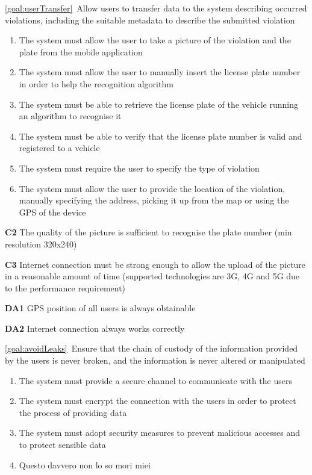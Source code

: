 \begin{description}
		\item \ref{goal:userTransfer}\ Allow users to transfer data to the system describing occurred violations, including the suitable metadata to describe the submitted violation			\begin{enumerate}[resume*]
				\item The system must allow the user to take a picture of the violation and the plate from the mobile application
  				\item The system must allow the user to manually insert the license plate number in order to help the recognition algorithm
  				\item The system must be able to retrieve the license plate of the vehicle running an algorithm to recognise it
  				\item The system must be able to verify that the license plate number is valid and registered to a vehicle
  				\item The system must require the user to specify the type of violation
  				\item The system must allow the user to provide the location of the violation, manually specifying the address, picking it up from the map or using the GPS of the device
   			\end{enumerate}
   			
   			\textbf{C2} The quality of the picture is sufficient to recognise the plate number (min resolution 320x240)
   			
			\textbf{C3} Internet connection must be strong enough to allow the upload of the picture in a reasonable amount of time (supported technologies are 3G, 4G and 5G due to the performance requirement)
			
			\textbf{DA1} GPS position of all users is always obtainable
			
			\textbf{DA2} Internet connection always works correctly
			
		\item \ref{goal:avoidLeaks}\ Ensure that the chain of custody of the information provided by the users is never broken, and the information is never altered or manipulated			\begin{enumerate}[resume*]
   				\item The system must provide a secure channel to communicate with the users
   				\item The system must encrypt the connection with the users in order to protect the process of providing data
   				\item The system must adopt security measures to prevent malicious accesses and to protect sensible data
   				\item Questo davvero non lo so mori miei
  			\end{enumerate}
  			

\end{description}
